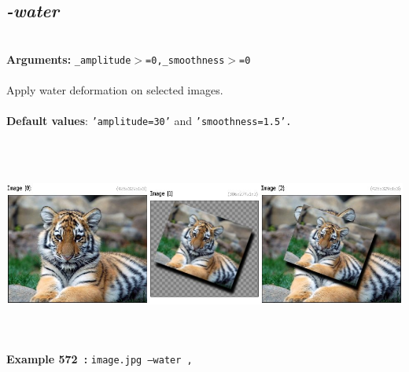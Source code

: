 \documentclass[a4paper,11pt,twoside]{book}
\begin{document}
\subsection{\emph{-water} }\vspace*{-0.5em}
~\\\textbf{Arguments: } 
{\small \texttt{\_amplitude$>$=0,\_smoothness$>$=0}}\\~\\
Apply water deformation on selected images.
~\\~\\\textbf{Default values}: {\small \texttt{'amplitude=30'} and \texttt{'smoothness=1.5'.}}
\begin{center}\includegraphics[keepaspectratio=true,height=7cm,width=\textwidth]{img/gmic_def572.jpg}\\
{\footnotesize \textbf{Example 572~:} \texttt{image.jpg --water ,}}
\end{center}
\end{document}
